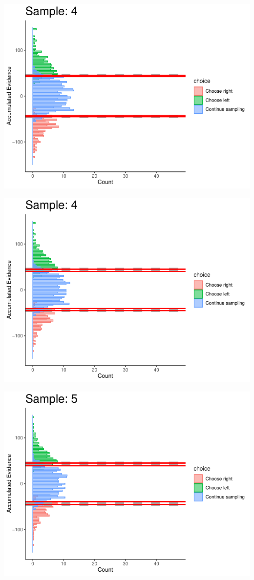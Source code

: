 \documentclass[
]{book}
\begin{document}
\begin{center}\includegraphics[width=0.8\linewidth]{LateNightBayes_files/figure-latex/collapsing_dcb-38} \end{center}

\begin{center}\includegraphics[width=0.8\linewidth]{LateNightBayes_files/figure-latex/collapsing_dcb-39} \end{center}

\begin{center}\includegraphics[width=0.8\linewidth]{LateNightBayes_files/figure-latex/collapsing_dcb-40} \end{center}
\end{document}
